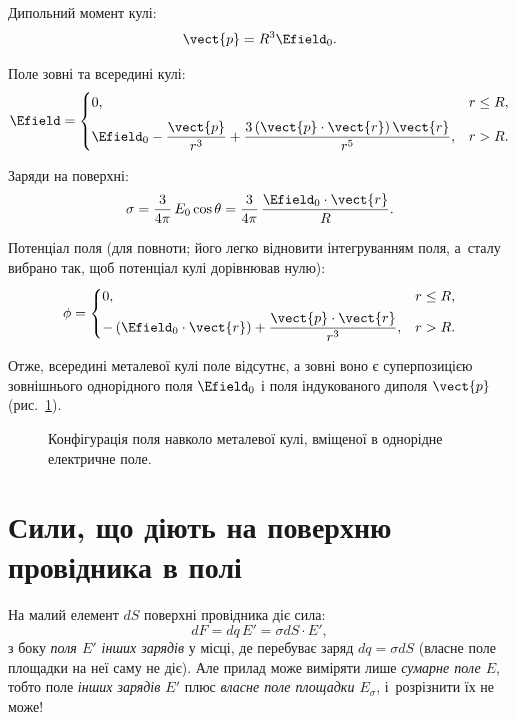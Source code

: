 Дипольний момент кулі:
\begin{equation*}
    \vect{p} = R^3\Efield_0 .
\end{equation*}

Поле зовні та всередині кулі:
\begin{equation*}
    \Efield =
    \begin{cases}
        0, & r \le R, \\[6pt]
        \Efield_0 - \dfrac{\vect{p}}{r^3}
        + \dfrac{3\left(\vect{p}\cdot\vect{r}\right)\vect{r}}{r^5},
           & r > R .
    \end{cases}
\end{equation*}

Заряди на поверхні:
\begin{equation*}
    \sigma = \frac{3}{4\pi}\,E_0\cos\theta
    = \frac{3}{4\pi}\,\frac{\Efield_0\cdot\vect{r}}{R} .
\end{equation*}

Потенціал поля (для повноти; його легко відновити інтегруванням поля, а~сталу вибрано так, щоб потенціал кулі дорівнював нулю):
\begin{equation*}
    \phi =
    \begin{cases}
        0,                                    & r \le R, \\[4pt]
        -\left(\Efield_0\cdot\vect{r}\right)
        + \dfrac{\vect{p}\cdot\vect{r}}{r^3}, & r > R .
    \end{cases}
\end{equation*}

Отже, всередині металевої кулі поле відсутнє, а зовні воно є суперпозицією
зовнішнього однорідного поля $\Efield_0$ і поля індукованого диполя $\vect{p}$
(рис.~\ref{tikz:EfieldMetall}).

\begin{figure}[h!]
    \centering
    \caption{Конфігурація поля навколо металевої кулі, вміщеної
        в однорідне електричне поле.}%
    \label{tikz:EfieldMetall}
\end{figure}

\section{Сили, що діють на поверхню провідника в полі}\hypertarget{conductor-surface-force}{}


На малий елемент $dS$ поверхні провідника діє сила:
\begin{equation*}
    dF = dq\, E' = \sigma dS \cdot  E',
\end{equation*}
з боку \emph{поля $E'$ інших зарядів} у місці, де
перебуває заряд $dq = \sigma dS$ (власне поле площадки на неї саму не діє). Але прилад
може виміряти лише \emph{сумарне поле $E$}, тобто поле \emph{інших зарядів $E'$} плюс
\emph{власне поле площадки $E_{\sigma}$}, і~розрізнити їх не може!

